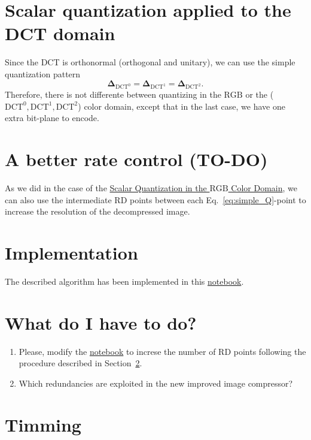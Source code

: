 \section{Scalar quantization applied to the DCT domain}
Since the DCT is orthonormal (orthogonal and unitary), we can use the
simple quantization pattern
\begin{equation}
  \mathbf{\Delta}_{\text{DCT}^0} = \mathbf{\Delta}_{\text{DCT}^1} = \mathbf{\Delta}_{\text{DCT}^2}.
  \label{eq:simple_Q}
\end{equation}
Therefore, there is not differente between quantizing in the $\text{RGB}$ or the ($\text{DCT}^0,\text{DCT}^1,\text{DCT}^2$) color domain, except that in the last case, we have one extra bit-plane to encode.

\section{A better rate control (TO-DO)}
\label{sec:increasing}
As we did in the case of the \href{https://sistemas-multimedia.github.io/contents/RGB_SQ/}{Scalar Quantization in the $\text{RGB}$ Color Domain}, we can also use the intermediate RD points between each
Eq.~\eqref{eq:simple_Q}-point to increase the resolution of the
decompressed image.

\section{Implementation}
The described algorithm has been implemented in this
\href{https://github.com/Sistemas-Multimedia/Sistemas-Multimedia.github.io/blob/master/contents/RGB_DCT_SQ/RGB_DCT_SQ.ipynb}{notebook}.

\section{What do I have to do?}

\begin{enumerate}
\item Please, modify the
  \href{https://github.com/Sistemas-Multimedia/Sistemas-Multimedia.github.io/blob/master/contents/RGB_DCT_SQ/RGB_DCT_SQ.ipynb}{notebook}
  to increse the number of RD points following the procedure described
  in Section~\ref{sec:increasing}.
\item Which redundancies are exploited in the new improved image
  compressor?
\end{enumerate}

\section{Timming}


